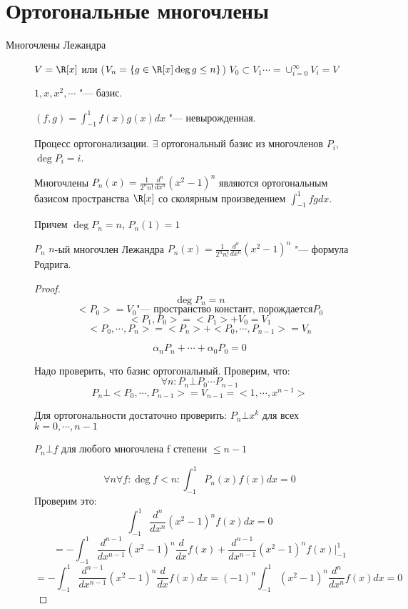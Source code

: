 ﻿\section{Ортогональные многочлены}
\begin{description}
    \item[Многочлены Лежандра]
    $V = \R[x]$ или ($V_n = \{g \in \R[x] \deg g \le n\}$)
    $V_0 \subset V_1 \cdots = \cup_{i = 0}^{\infty}V_i = V$ 

    $1,x, x^2, \cdots$ "--- базис. 

    $(f, g) = \int_{-1}^{1}f(x)g(x)dx$ "--- невырожденная. 

    Процесс ортогонализации. $\exists$ ортогональный базис из многочленов $P_i$, $\deg P_i = i$.

    \begin{theorem}{}
        Многочлены $P_n(x) = \frac{1}{2^nn!}\frac{d^n}{dx^n}(x^2 - 1)^n$
        являются ортогональным базисом пространства $\R[x]$ со сколярным произведением $\int_{-1}^{1}fgdx$.

        Причем $\deg P_n = n$, $P_n(1) = 1$
    \end{theorem}
    \begin{Def}
    $P_n$ $n$-ый многочлен Лежандра
    $P_n(x) = \frac{1}{2^nn!}\frac{d^n}{dx^n}(x^2 - 1)^n$ "--- формула Родрига. 
    \end{Def}
    \begin{proof}
    $$\deg P_n = n$$
    $$<P_0> = V_0 \text{"--- пространство констант, порождается} P_0$$
    $$<P_1, P_0> = <P_1> + V_0 = V_1$$
    $$<P_0, \cdots, P_n> = <P_n> + <P_0, \cdots, P_{n - 1}> = V_n$$

    $$\alpha_nP_n + \cdots + \alpha_0P_0 = 0$$

    Надо проверить, что базис ортогональный. 
    Проверим, что:
    $$\forall n \colon P_n \bot P_0 \cdots P_{n - 1}$$
    $$P_n \bot <P_0, \cdots, P_{n - 1}> = V_{n - 1} = <1, \cdots, x^{n - 1}> $$

    Для ортогональности достаточно проверить: $P_n \bot x^{k}$ для всех $k = 0, \cdots, n - 1$

    $P_n \bot f$ для любого многочлена f степени $\le n - 1$

    $$\forall n \forall f \colon \deg f < n \colon \int_{-1}^{1}P_{n}(x)f(x)dx = 0$$
    Проверим это:
    $$\int_{-1}^{1}\frac{d^n}{dx^n}(x^2 - 1)^n f(x)dx = 0$$
    $$ = - \int_{-1}^{1}\frac{d^{n - 1}}{dx^{n - 1}}(x^2 - 1)^n\frac{d}{dx}f(x) + \frac{d^{n - 1}}{dx^{n - 1}}(x^2 - 1)^nf(x)|_{-1}^{1} $$
    $$ = - \int_{-1}^{1}\frac{d^{n - 1}}{dx^{n - 1}}(x^2 - 1)^n\frac{d}{dx}f(x)dx = (-1)^n\int_{-1}^{1}(x^2 - 1)^n\frac{d^n}{dx^n}f(x)dx = 0$$


\end{proof}
\end{description}
